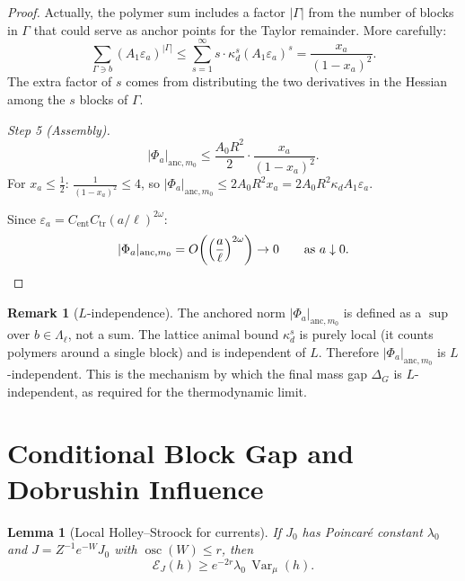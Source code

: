 \documentclass[12pt]{article}
\theoremstyle{plain}
\newtheorem{lemma}[theorem]{Lemma}
\theoremstyle{definition}
\newtheorem{remark}[theorem]{Remark}
\numberwithin{equation}{section}
\newcommand{\Var}{\operatorname{Var}}
\newcommand{\osc}{\operatorname{osc}}
\newcommand{\tr}{\mathrm{tr}}
\begin{document}
\begin{proof}
Actually, the polymer sum includes a factor $|\Gamma|$ from the number of blocks in $\Gamma$ that could serve as anchor points for the Taylor remainder.  More carefully:
\begin{equation}
\sum_{\Gamma\ni b}(A_1\varepsilon_a)^{|\Gamma|} \leq \sum_{s=1}^\infty s\cdot\kappa_d^s(A_1\varepsilon_a)^s = \frac{x_a}{(1-x_a)^2}.
\end{equation}
The extra factor of $s$ comes from distributing the two derivatives in the Hessian among the $s$ blocks of $\Gamma$.

\emph{Step 5 (Assembly).}
\begin{equation}
|\Phi_a|_{\mathrm{anc},m_0} \leq \frac{A_0 R^2}{2}\cdot\frac{x_a}{(1-x_a)^2}.
\end{equation}
For $x_a\leq\frac{1}{2}$: $\frac{1}{(1-x_a)^2}\leq 4$, so $|\Phi_a|_{\mathrm{anc},m_0}\leq 2A_0 R^2 x_a=2A_0 R^2\kappa_d A_1\varepsilon_a$.

Since $\varepsilon_a=C_{\mathrm{ent}}C_{\tr}(a/\ell)^{2\omega}$:
\begin{equation}
|\Phi_a|_{\mathrm{anc},m_0} = O\!\left(\left(\frac{a}{\ell}\right)^{2\omega}\right) \to 0\qquad\text{as }a\downarrow 0.\qedhere
\end{equation}
\end{proof}

\begin{remark}[$L$-independence]
The anchored norm $|\Phi_a|_{\mathrm{anc},m_0}$ is defined as a $\sup$ over $b\in\Lambda_\ell$, not a sum.  The lattice animal bound $\kappa_d^s$ is purely local (it counts polymers around a single block) and is independent of $L$.  Therefore $|\Phi_a|_{\mathrm{anc},m_0}$ is $L$-independent.  This is the mechanism by which the final mass gap $\Delta_G$ is $L$-independent, as required for the thermodynamic limit.
\end{remark}

\section{Conditional Block Gap and Dobrushin Influence}\label{sec:blockgap}

\begin{lemma}[Local Holley--Stroock for currents]\label{lem:HS}
If $J_0$ has Poincar\'e constant $\lambda_0$ and $J=Z^{-1}e^{-W}J_0$ with $\osc(W)\leq r$, then
\begin{equation}
\mathcal{E}_J(h) \geq e^{-2r}\lambda_0\,\Var_\mu(h).
\end{equation}
\end{lemma}
\end{document}
